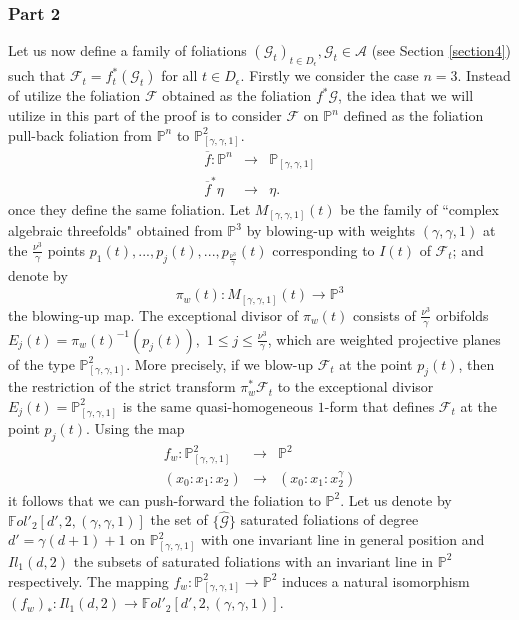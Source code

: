 \documentclass{amsart}
\theoremstyle{definition}
\theoremstyle{proposition}
\numberwithin{equation}{section}
\theoremstyle{main}
\begin{document}
\subsubsection{Part 2} Let us now define a family of foliations $(\mathcal {G}_{t})_{t\in D_{\epsilon}}, \mathcal {G}_{t} \in  \mathcal A$ (see Section \ref{section4}) such that  $\mathcal{F}_{t}= f_{t}^{ \ast}(\mathcal{G}_{t})$ for all $t\in D_{\epsilon}$. Firstly we consider the case $n=3.$
Instead of utilize the foliation $\mathcal F$ obtained as the foliation $f^*\mathcal G$, the idea that we will utilize in this part of the proof is to consider $\mathcal F$ on $\mathbb P^n$ defined as the foliation pull-back foliation from $\mathbb P^n$ to $\mathbb P_{[\gamma,\gamma,1]}^2$. 
 \begin{eqnarray*}
\overline{f}:\mathbb P^n&\to&\mathbb P_{[\gamma,\gamma,1]}\\
         \overline{f}^*\eta &\to& \eta.
\end{eqnarray*} once they define the same foliation.
 Let $M_{[\gamma,\gamma,1]}(t)$ be the family of ``complex algebraic threefolds" obtained from $\mathbb P^3$ by blowing-up with weights $(\gamma, \gamma,1)$ at the $\frac{\nu^{3}}{ \gamma}$ points $p_{1}(t),..., p_{j}(t),...,p_{\frac{\nu^{3}}{\gamma}}(t)$ corresponding to $I(t)$ of $\mathcal F_{t}$; and denote by $$\pi_{w}(t):M_{[\gamma,\gamma,1]}(t) \to \mathbb P^3$$ the blowing-up map. The exceptional divisor of $\pi_{w}(t)$ consists of ${\frac{\nu^{3}}{\gamma}}$ orbifolds \break $E_{j}(t)=\pi_{w}(t)^{-1}(p_{j}(t)),$ $1\leq j \leq {\frac{\nu^{3}}{\gamma}}$, which are weighted projective planes of the type $\mathbb P_{[\gamma,\gamma,1]}^2$.
 More precisely, if we blow-up $\mathcal{F}_{t}$ at the point $p_{j}(t)$, then the restriction of the strict transform $\pi_{w}^{\ast}\mathcal{F}_{t}$ to the exceptional divisor $E_{j}(t)=\mathbb P_{[\gamma,\gamma,1]}^2$ is the same quasi-homogeneous $1$-form that defines $\mathcal{F}_{t}$ at the point $p_{j}(t)$.
Using the map \begin{eqnarray*}
{f_w} : \mathbb P_{[\gamma,\gamma,1]}^2&\to& \mathbb P^2\\
         (x_{0}: x_{1}:x_{2})&\to& (x_{0}: x_{1}: x_{2}^{\gamma})
\end{eqnarray*}
it follows that we can push-forward the foliation to $\mathbb P^2$. 
Let us denote by \break$ \mathbb{F}ol'_{2}[d',2,(\gamma,\gamma,1)]$ the set of
 $\{\hat{\mathcal G}\}$  saturated foliations of degree $d'=\gamma(d+1)+1$ on $\mathbb P^2_{[\gamma,\gamma,1]}$ with one invariant line in general position and $Il_{1}(d,2)$  the subsets of saturated foliations with an invariant line in $\mathbb P^2$ respectively. The mapping ${f_w} : \mathbb P_{[\gamma,\gamma,1]}^2\to \mathbb P^2$ induces a natural isomorphism $({f_w})_*: Il_{1}(d,2) \to\mathbb{F}ol'_{2}[d',2,(\gamma,\gamma,1)]$. 
\end{document}
